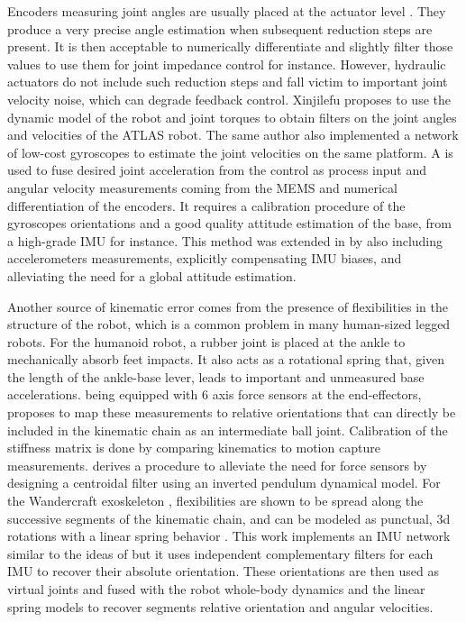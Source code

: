 Encoders measuring joint angles are usually placed at the actuator level \cite{xinjilefu2014decoupled}. 
They produce a very precise angle estimation when subsequent reduction steps are present. It is then acceptable to numerically 
differentiate and slightly filter those values to use them for joint impedance control for instance. However, hydraulic
actuators do not include such reduction steps and fall victim to important joint velocity noise, which can degrade feedback control.
Xinjilefu \cite{xinjilefu2014decoupled} proposes to use the dynamic model of the robot and joint torques to obtain filters on the joint angles and velocities
of the ATLAS robot. The same author \cite{xinjilefu2016distributed} also implemented a network of low-cost gyroscopes to estimate the joint velocities 
on the same platform. A \KalmanF is used to fuse desired joint acceleration from the control as process input and angular velocity measurements coming from 
the MEMS and numerical differentiation of the encoders. It requires a calibration procedure of the gyroscopes orientations and a good quality attitude
estimation of the base, from a high-grade IMU for instance. This method was extended in \cite{rotella2016imu} by also including
accelerometers measurements, explicitly compensating IMU biases, and alleviating the need for a global attitude estimation.

Another source of kinematic error comes from the presence of flexibilities in the structure of the robot, which is a common problem in many human-sized legged robots. 
For the  humanoid robot, a rubber joint is placed at the ankle to mechanically absorb feet impacts. 
It also acts as a rotational spring that, given the length of the ankle-base lever, 
leads to important and unmeasured base accelerations.  being equipped with 6 axis 
force sensors at the end-effectors, \cite{flayols2017experimental} proposes to map these measurements to relative orientations that can 
directly be included in the kinematic chain as an intermediate ball joint. Calibration of the stiffness matrix is done by comparing 
kinematics to motion capture measurements. \cite{benallegue2015estimation} derives a procedure to alleviate the need for force sensors by 
designing a centroidal filter using an inverted pendulum dynamical
model. For the Wandercraft exoskeleton \cite{harib2018feedback}, flexibilities
are shown to be spread along the successive segments of the kinematic chain, and can be modeled as punctual, 
3d rotations with a linear spring behavior \cite{vigne2018estimation}. This work implements an IMU network similar to the ideas of 
\cite{xinjilefu2016distributed,rotella2016imu} but it uses independent complementary filters for each IMU to recover their absolute orientation. 
These orientations are then used as virtual joints and fused with the robot whole-body dynamics and the linear spring models to recover segments 
relative orientation and angular velocities.

